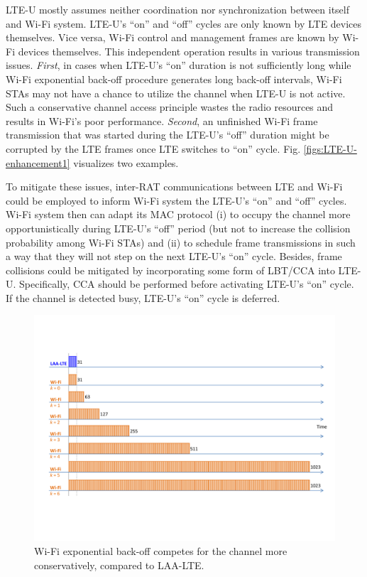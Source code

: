 LTE-U mostly assumes neither coordination nor synchronization between itself and Wi-Fi system. LTE-U's ``on'' and ``off'' cycles are only known by LTE devices themselves. Vice versa, Wi-Fi control and management frames are known by Wi-Fi devices themselves. This independent operation results in various transmission issues. \textit{First}, in cases when LTE-U's ``on'' duration is not sufficiently long while Wi-Fi exponential back-off procedure generates long back-off intervals, Wi-Fi STAs may not have a chance to utilize the channel when LTE-U is not active. Such a conservative channel access principle wastes the radio resources and results in Wi-Fi's poor performance. \textit{Second}, an unfinished Wi-Fi frame transmission that was started during the LTE-U's ``off'' duration might be corrupted by the LTE frames once LTE switches to ``on'' cycle. Fig. \ref{figs:LTE-U-enhancement1} visualizes two examples.

To mitigate these issues, inter-RAT communications between LTE and Wi-Fi could be employed to inform Wi-Fi system the LTE-U's ``on'' and ``off'' cycles. Wi-Fi system then can adapt its MAC protocol (i) to occupy the channel more opportunistically during LTE-U's ``off'' period (but not to increase the collision probability among Wi-Fi STAs) and (ii) to schedule frame transmissions in such a way that they will not step on the next LTE-U's ``on'' cycle. Besides, frame collisions could be mitigated by incorporating some form of LBT/CCA into LTE-U. Specifically, CCA should be performed before activating LTE-U's ``on'' cycle. If the channel is detected busy, LTE-U's ``on'' cycle is deferred.

\begin{figure}[!t]
	\centering
	\includegraphics[width=1.0\columnwidth]{figures2/LAA-LTE-enhacement-back-off}
	\caption{Wi-Fi exponential back-off competes for the channel more conservatively, compared to LAA-LTE.}
	\label{figs:LAA-LTE-enhacement-back-off}
\end{figure}

